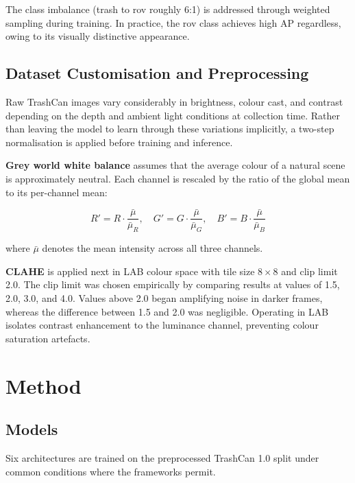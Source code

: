 \documentclass[conference]{IEEEtran}
\begin{document}
The class imbalance (trash to rov roughly 6:1) is addressed through
weighted sampling during training. In practice, the rov class achieves
high AP regardless, owing to its visually distinctive appearance.

\subsection{Dataset Customisation and Preprocessing}

Raw TrashCan images vary considerably in brightness, colour cast, and
contrast depending on the depth and ambient light conditions at collection
time. Rather than leaving the model to learn through these variations
implicitly, a two-step normalisation is applied before training and inference.

\textbf{Grey world white balance} assumes that the average colour of a
natural scene is approximately neutral. Each channel is rescaled by the
ratio of the global mean to its per-channel mean:

\begin{equation}
    R' = R \cdot \frac{\bar{\mu}}{\bar{\mu}_{R}}, \quad
    G' = G \cdot \frac{\bar{\mu}}{\bar{\mu}_{G}}, \quad
    B' = B \cdot \frac{\bar{\mu}}{\bar{\mu}_{B}}
    \label{eq:gwb}
\end{equation}

where $\bar{\mu}$ denotes the mean intensity across all three channels.

\textbf{CLAHE} is applied next in LAB colour space with tile size
$8 \times 8$ and clip limit 2.0. The clip limit was chosen empirically
by comparing results at values of 1.5, 2.0, 3.0, and 4.0. Values above
2.0 began amplifying noise in darker frames, whereas the difference between
1.5 and 2.0 was negligible. Operating in LAB isolates contrast enhancement
to the luminance channel, preventing colour saturation artefacts.


\section{Method}

\subsection{Models}

Six architectures are trained on the preprocessed TrashCan 1.0 split under
common conditions where the frameworks permit.
\end{document}
